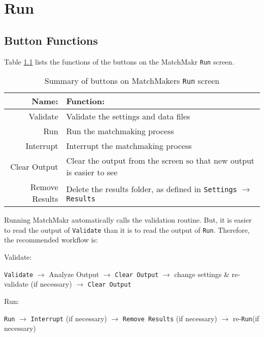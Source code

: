 \renewcommand{\pb}[1]{\parbox[t]{0.3\textwidth}{#1}}
\renewcommand{\tabline}[3]{#1 & #2 & #3\\ \hline}
\renewcommand{\multientry}[2]{& #1  & #2 \\ \cline{2-3} }
\renewcommand{\multiending}[2]{& #1 & #2  \\ \hline}

\chapter{Run}

\section{Button Functions}
Table \ref{tab:runbuttons} lists the functions of the buttons on the MatchMakr \texttt{Run} screen.

\begin{table}[h!]
	\centering
	\begin{tabular}{| r | l|}
		\hline
		\textbf{Name:} & \textbf{Function:} \\ \hline \hline
		
		Validate & Validate the settings and data files \\ \hline
		Run & Run the matchmaking process \\ \hline
		Interrupt & Interrupt the matchmaking process \\ \hline
		Clear Output & Clear the output from the screen so that new output is easier to see \\ \hline
		Remove Results & Delete the results folder, as defined in \texttt{Settings} $\rightarrow$ 
							\texttt{Results} \\ \hline
		
	\end{tabular}
	\caption{\label{tab:runbuttons} Summary of buttons on MatchMakers \texttt{Run} screen}
\end{table}

Running MatchMakr automatically calls the validation routine.  But, it is easier to read the output of \texttt{Validate} than it is to read the output of \texttt{Run}.  Therefore, the recommended workflow is:

Validate: \par
\texttt{Validate} $\rightarrow$ Analyze Output $\rightarrow$ \texttt{Clear Output} $\rightarrow$ change settings \& re-validate (if necessary) $\rightarrow$ \texttt{Clear Output}

Run: \par
\texttt{Run} $\rightarrow$ \texttt{Interrupt} (if necessary) $\rightarrow$ \texttt{Remove Results} (if necessary) $\rightarrow$ re-\texttt{Run}(if necessary) 


